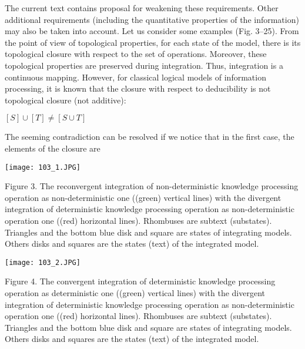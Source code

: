 \documentclass{article}
\begin{document}
\begin{multicols}{2}
\hspace{0.27cm}The current text contains proposal for weakening these
requirements. Other additional requirements (including
the quantitative properties of the information) may also
be taken into account.\newline
\vspace{0.5pt}
\hspace{0.27cm}Let us consider some examples (Fig. 3–25).\newline
\vspace{0.5pt}
\hspace{0.25cm}From the point of view of topological properties, for
each state of the model, there is its topological closure
with respect to the set of operations. Moreover, these
topological properties are preserved during integration.
Thus, integration is a continuous mapping. However, for
classical logical models of information processing, it is
known that the closure with respect to deducibility is not
topological closure (not additive):

\begin{center}
$[S] \cup [T] \neq [S \cup T]$ 
\end{center}

\hspace{0.27cm}The seeming contradiction can be resolved if we notice
that in the first case, the elements of the closure are
\begin{center}
\texttt{[image: 103\_1.JPG]}
\end{center}

\scriptsize Figure 3. The reconvergent integration of non-deterministic knowledge
processing operation as non-deterministic one ((green) vertical lines)
with the divergent integration of deterministic knowledge processing
operation as non-deterministic operation one ((red) horizontal lines).
Rhombuses are subtext (substates). Triangles and the bottom blue disk
and square are states of integrating models. Others disks and squares
are the states (text) of the integrated model.

\begin{center}
\texttt{[image: 103\_2.JPG]}
\end{center}

\scriptsize Figure 4. The convergent integration of deterministic knowledge
processing operation as deterministic one ((green) vertical lines) with the
divergent integration of deterministic knowledge processing operation
as non-deterministic operation one ((red) horizontal lines). Rhombuses
are subtext (substates). Triangles and the bottom blue disk and square
are states of integrating models. Others disks and squares are the states
(text) of the integrated model.


\end{multicols}
\end{document}
